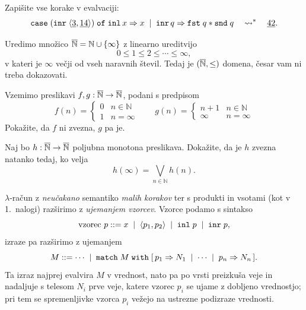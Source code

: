 \documentclass[arhiv]{../izpit}
\begin{document}
\podnaloga
Zapišite vse korake v evalvaciji:
\[
  \mathtt{case}\;(\mathtt{inr}\; \langle \underline{3}, \underline{14}\rangle)\;\mathtt{of}\;\mathtt{inl}\,x \Rightarrow x \;\mid\; \mathtt{inr}\,q \Rightarrow \mathtt{fst}\; q * \mathtt{snd}\; q
  \quad\leadsto^*\quad
  \underline{42}.
\]

\nadaljevanje


\naloga[\tocke{20}]

Uredimo množico $\overline{\mathbb{N}} = \mathbb{N} \cup \{\infty\}$ z linearno ureditvijo
\[
  0 \le 1 \le 2 \le \cdots \le \infty,
\]
v kateri je $\infty$ večji od vseh naravnih števil. Tedaj je $(\overline{\mathbb{N}}, \le)$ domena, česar vam ni treba dokazovati.

\podnaloga
Vzemimo preslikavi $f, g : \overline{\mathbb{N}} \to \overline{\mathbb{N}}$, podani s predpisom
\[
  f(n) = \begin{cases}
    0 & n \in \mathbb{N} \\
    1 & n = \infty
  \end{cases}
  \qquad
  g(n) = \begin{cases}
    n + 1 & n \in \mathbb{N} \\
    \infty & n = \infty
  \end{cases}
\]
Pokažite, da $f$ ni zvezna, $g$ pa je.

\podnaloga
Naj bo $h : \overline{\mathbb{N}} \to \overline{\mathbb{N}}$ poljubna monotona preslikava. Dokažite, da je $h$ zvezna natanko tedaj, ko velja
\[
  h(\infty) = \bigvee_{n \in \mathbb{N}} h(n).
\]

\nadaljevanje


\naloga[\tocke{20}]

\newcommand{\matchexpr}[2]{\mathtt{match}\;#1\;\mathtt{with}\;#2}

$\lambda$-račun z \emph{neučakano} semantiko \emph{malih korakov} ter s produkti in vsotami (kot v 1.~nalogi) razširimo z \emph{ujemanjem vzorcev}. Vzorce podamo s sintakso
\[
  \text{vzorec } p \mathrel{{:}{:}{=}} x \;\mid\; \langle p_1, p_2\rangle \;\mid\; \mathtt{inl}\; p \;\mid\; \mathtt{inr}\; p,
\]
izraze pa razširimo z ujemanjem
\[
  M \bnfis \cdots \bnfor \matchexpr{M}{[\,p_1 \Rightarrow N_1 \bnfor \cdots \bnfor p_n \Rightarrow N_n\,]}.
\]
Ta izraz najprej evalvira $M$ v vrednost, nato pa po vrsti preizkuša veje in nadaljuje s telesom $N_i$ prve veje, katere vzorec $p_i$ se ujame z dobljeno vrednostjo; pri tem se spremenljivke vzorca $p_i$ vežejo na ustrezne podizraze vrednosti.
\end{document}
